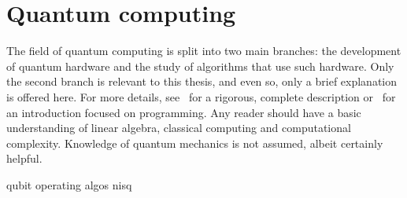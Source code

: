 \chapter{Quantum computing}
\label{chap:qc}
The field of quantum computing is split into two main branches: the development of quantum hardware and the study of algorithms that use such hardware.
Only the second branch is relevant to this thesis, and even so, only a brief explanation is offered here.
For more details, see~\autocite{nielsen2012} for a rigorous, complete description or~\autocite{qiskit_textbook} for an introduction focused on programming.
Any reader should have a basic understanding of linear algebra, classical computing and computational complexity.
Knowledge of quantum mechanics is not assumed, albeit certainly helpful.

{qubit}
{operating}
{algos}
{nisq}





